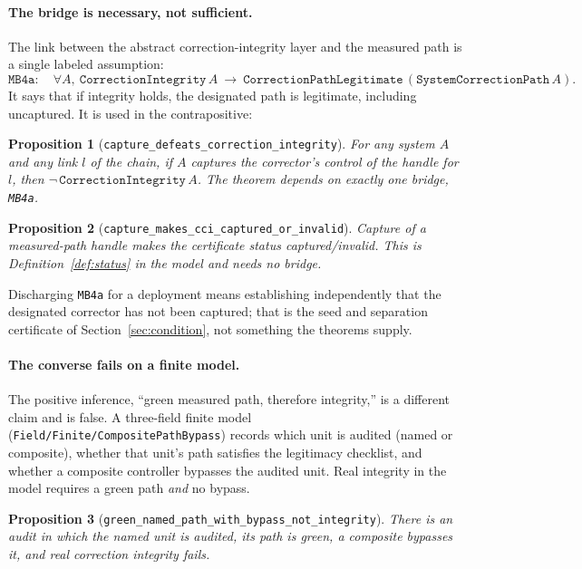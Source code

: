 \documentclass[11pt]{article}
\newtheorem{proposition}{Proposition}
\theoremstyle{remark}
\newcommand{\lean}[1]{\texttt{#1}}
\begin{document}
\paragraph{The bridge is necessary, not sufficient.}
The link between the abstract correction-integrity layer and the measured path is a single labeled assumption:
\[
\lean{MB4a}:\quad \forall A,\ \lean{CorrectionIntegrity}\,A\ \rightarrow\ \lean{CorrectionPathLegitimate}\,(\lean{SystemCorrectionPath}\,A).
\]
It says that if integrity holds, the designated path is legitimate, including uncaptured. It is used in the contrapositive:

\begin{proposition}[\lean{capture\_defeats\_correction\_integrity}]
For any system $A$ and any link $l$ of the chain, if $A$ captures the corrector's control of the handle for $l$, then $\neg\,\lean{CorrectionIntegrity}\,A$. The theorem depends on exactly one bridge, \lean{MB4a}.
\end{proposition}

\begin{proposition}[\lean{capture\_makes\_cci\_captured\_or\_invalid}]
Capture of a measured-path handle makes the certificate status \emph{captured/invalid}. This is Definition~\ref{def:status} in the model and needs no bridge.
\end{proposition}

Discharging \lean{MB4a} for a deployment means establishing independently that the designated corrector has not been captured; that is the seed and separation certificate of Section~\ref{sec:condition}, not something the theorems supply.

\paragraph{The converse fails on a finite model.}
The positive inference, ``green measured path, therefore integrity,'' is a different claim and is false. A three-field finite model (\lean{Field/Finite/CompositePathBypass}) records which unit is audited (named or composite), whether that unit's path satisfies the legitimacy checklist, and whether a composite controller bypasses the audited unit. Real integrity in the model requires a green path \emph{and} no bypass.

\begin{proposition}[\lean{green\_named\_path\_with\_bypass\_not\_integrity}]
There is an audit in which the named unit is audited, its path is green, a composite bypasses it, and real correction integrity fails.
\end{proposition}
\end{document}
